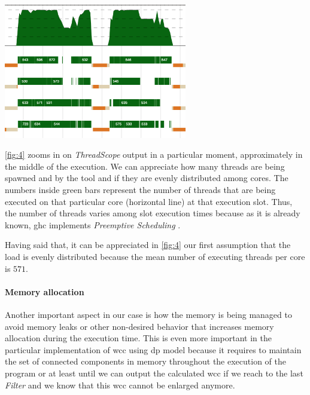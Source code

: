 \documentclass[preprint]{elsarticle}
\begin{document}
\begin{minipage}[t!]{\linewidth}
\begin{center}
  \includegraphics[width=0.6\textwidth]{screen_2}
  \captionsetup{type=figure}
  \label{fig:4}
  \end{center}
\end{minipage}

\autoref{fig:4} zooms in on \textit{ThreadScope} output in a particular moment, approximately in the middle of the execution. We can appreciate how many threads are being spawned and by the tool and if they are evenly distributed among cores. The numbers inside green bars represent the number of threads that are being executed on that particular core (horizontal line) at that execution slot. Thus, the number of threads varies among slot execution times because as it is already known, \acrshort{ghc} implements \emph{Preemptive Scheduling} \cite{lightweightghc}.

Having said that, it can be appreciated in \autoref{fig:4} our first assumption that the load is evenly distributed because the mean number of executing threads per core is $571$.

\paragraph{Memory allocation} Another important aspect in our case is how the memory is being managed to avoid memory leaks or other non-desired behavior that increases memory allocation during the execution time. This is even more important in the particular implementation of \acrshort{wcc} using \acrshort{dp} model because it requires to maintain the set of connected components in memory throughout the execution of the program or at least until we can output the calculated \acrshort{wcc} if we reach to the last \textit{Filter} and we know that this \acrshort{wcc} cannot be enlarged anymore. 
\end{document}
